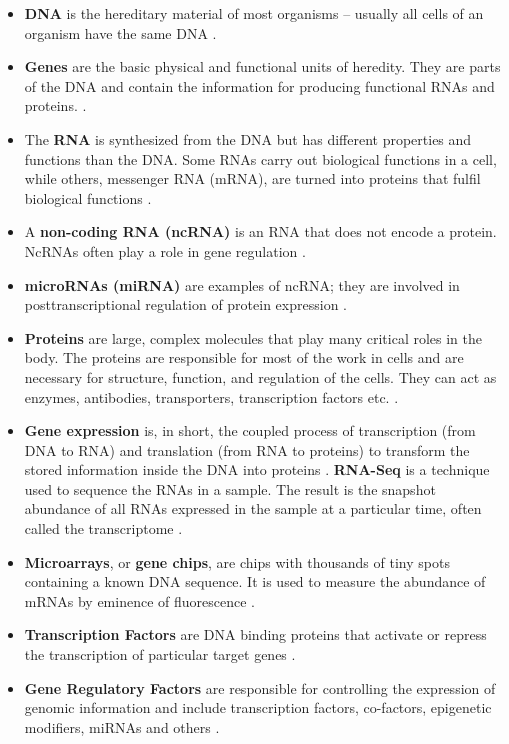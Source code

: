 \documentclass[
]{book}
\begin{document}
\begin{itemize}
\item
  \textbf{DNA} is the hereditary material of most organisms -- usually all cells of an organism have the same DNA \citep{Slack2013}.
\item
  \textbf{Genes} are the basic physical and functional units of heredity. They are parts of the DNA and contain the information for producing functional RNAs and proteins. \citep{Slack2013}.
\item
  The \textbf{RNA} is synthesized from the DNA but has different properties and functions than the DNA. Some RNAs carry out biological functions in a cell, while others, messenger RNA (mRNA), are turned into proteins that fulfil biological functions \citep{Slack2013}.
\item
  A \textbf{non-coding RNA (ncRNA)} is an RNA that does not encode a protein. NcRNAs often play a role in gene regulation \citep{MattickNon-codingRNA}.
\item
  \textbf{microRNAs (miRNA)} are examples of ncRNA; they are involved in posttranscriptional regulation of protein expression \citep{Tanase2012MicroRNAs}.
\item
  \textbf{Proteins} are large, complex molecules that play many critical roles in the body. The proteins are responsible for most of the work in cells and are necessary for structure, function, and regulation of the cells. They can act as enzymes, antibodies, transporters, transcription factors etc. \citep{Slack2013}.
\item
  \textbf{Gene expression} is, in short, the coupled process of transcription (from DNA to RNA) and translation (from RNA to proteins) to transform the stored information inside the DNA into proteins \citep{Slack2013}. \textbf{RNA-Seq} is a technique used to sequence the RNAs in a sample. The result is the snapshot abundance of all RNAs expressed in the sample at a particular time, often called the transcriptome \citep{Metzker2010SequencingGeneration}.
\item
  \textbf{Microarrays}, or \textbf{gene chips}, are chips with thousands of tiny spots containing a known DNA sequence. It is used to measure the abundance of mRNAs by eminence of fluorescence \citep{Slack2013}.
\item
  \textbf{Transcription Factors} are DNA binding proteins that activate or repress the transcription of particular target genes \citep{Latchman1997TranscriptionOverview}.
\item
  \textbf{Gene Regulatory Factors} are responsible for controlling the expression of genomic information and include transcription factors, co-factors, epigenetic modifiers, miRNAs and others \citep{Hobert2008GeneMicroRNAs}.

\end{itemize}
\end{document}
